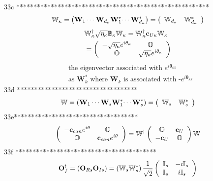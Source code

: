 \documentclass[aps,preprint]{revtex4}%
\begin{document}
33c ********************************************************%
\[
\mathbb{W}_{\kappa}=\left(  \mathbf{W}_{1}\cdots\mathbf{W}_{d_{\kappa}%
}\mathbf{W}_{1}^{\ast}\mathbf{\cdots W}_{d_{\kappa}}^{\ast}\right)  =\left(
\begin{array}
[c]{cc}%
\mathbb{W}_{d_{\kappa}} & \mathbb{W}_{d_{\kappa}}^{\ast}%
\end{array}
\right)
\]%
\begin{align*}
&  \mathbb{W}_{\kappa}^{\dagger}\sqrt{\eta_{\kappa}}\mathbb{B}_{\kappa
}\mathbb{W}_{\kappa}=\mathbb{W}_{\kappa}^{\dagger}\mathbf{c}_{U\kappa
}\mathbb{W}_{\kappa}\\
&  =\left(
\begin{array}
[c]{cc}%
-\sqrt{\eta_{\kappa}}e^{i\mathbf{\theta}_{\kappa}} & \mathbb{O}\\
\mathbb{O} & \sqrt{\eta_{\kappa}}e^{i\mathbf{\theta}_{\kappa}}%
\end{array}
\right)
\end{align*}%
\begin{align*}
&  \text{the eigenvector associated with }e^{i\mathbf{\theta}_{\kappa k}%
}\text{ }\\
&  \text{as }\mathbf{W}_{k}^{\ast}\text{ where }\mathbf{W}_{k}\text{ is
associated with -}e^{i\mathbf{\theta}_{\kappa k}}%
\end{align*}
33d ***********************************%
\[
\mathbb{W}=\left(  \mathbf{W}_{1}\cdots\mathbf{W}_{s}\mathbf{W}_{1}^{\ast
}\mathbf{\cdots W}_{s}^{\ast}\right)  =\left(
\begin{array}
[c]{cc}%
\mathbb{W}_{s} & \mathbb{W}_{s}^{\ast}%
\end{array}
\right)
\]
33e************************************%
\[
\left(
\begin{array}
[c]{cc}%
-\mathbf{c}_{can}e^{i\mathbf{\theta}} & \mathbb{O}\\
\mathbb{O} & \mathbf{c}_{can}e^{i\mathbf{\theta}}%
\end{array}
\right)  =\mathbb{W}^{\dagger}\left(
\begin{array}
[c]{cc}%
\mathbb{O} & \mathbf{c}_{U}\\
-\mathbf{c}_{U} & \mathbb{O}%
\end{array}
\right)  \mathbb{W}%
\]
33f *****************************************%
\[
\mathbf{O}_{f}^{t}=\left(  \mathbf{O}_{Rs}\mathbf{O}_{Is}\right)  =\left(
\mathbb{W}_{s}\mathbb{W}_{s}^{\ast}\right)  \frac{1}{\sqrt{2}}\left(
\begin{array}
[c]{cc}%
\mathbb{I}_{s} & -i\mathbb{I}_{s}\\
\mathbb{I}_{s} & i\mathbb{I}_{s}%
\end{array}
\right)
\]
\end{document}

